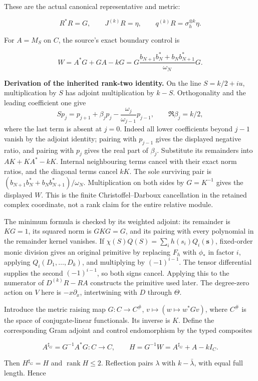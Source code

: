 These are the actual canonical representative and metric:

\[
R^*R=G,\qquad J^{(k)}R=\eta,\qquad
q^{(k)}R=\sigma_h^{\otimes k}\eta.
\]

For \(A=M_S\) on \(C\), the source's exact boundary control is

\[
\boxed{
W=A^*G+GA-kG
=G\frac{b_{N+1}b_N^*+b_Nb_{N+1}^*}{\omega_N}G.
}
\]

\textbf{Derivation of the inherited rank-two identity.}
On the line \(S=k/2+iu\), multiplication by \(S\) has adjoint
multiplication by \(k-S\). Orthogonality and the leading coefficient one give
\[
Sp_j=p_{j+1}+\beta_jp_j-\frac{\omega_j}{\omega_{j-1}}p_{j-1},
\qquad \Re\beta_j=k/2,
\]
where the last term is absent at \(j=0\).
Indeed all lower coefficients beyond \(j-1\) vanish by the adjoint identity;
pairing with \(p_{j-1}\) gives the displayed negative ratio, and pairing
with \(p_j\) gives the real part of \(\beta_j\). Substitute its remainders
into \(AK+KA^*-kK\). Internal neighbouring terms cancel with their exact
norm ratios, and the diagonal terms cancel \(kK\). The sole surviving pair
is \((b_{N+1}b_N^*+b_Nb_{N+1}^*)/\omega_N\).
Multiplication on both sides by \(G=K^{-1}\) gives the displayed \(W\).
This is the finite Christoffel--Darboux cancellation in the retained
complex coordinate, not a rank claim for the entire relative module.

The minimum formula is checked by its weighted adjoint:
its remainder is \(KG=1\), its squared norm is \(GKG=G\), and its
pairing with every polynomial in the remainder kernel vanishes.
If \(\chi(S)Q(S)=\sum_i h(s_i)Q_i(\mathbf s)\), fixed-order monic
division gives an original primitive by replacing \(F_h\) with \(\phi_*\)
in factor \(i\), applying \(Q_i(D_1,\ldots,D_k)\), and multiplying by
\((-1)^{i-1}\). The tensor differential supplies the second
\((-1)^{i-1}\), so both signs cancel. Applying this to the numerator
of \(D^{(k)}R-RA\) constructs the primitive used later.
The degree-zero action on \(V\) here is \(-x\partial_x\), intertwining
with \(D\) through \(\Theta\).

Introduce the metric raising map \(G:C\to C^\#\),
\(v\mapsto(w\mapsto w^*Gv)\), where \(C^\#\) is the space of
conjugate-linear functionals. Its inverse is \(K\). Define the
corresponding Gram adjoint and control endomorphism by the typed
composites

\[
A^{\sharp_G}=G^{-1}A^*G:C\to C,
\qquad
H=G^{-1}W=A^{\sharp_G}+A-kI_C.
\]

Then \(H^{\sharp_G}=H\) and \(\operatorname{rank}H\leq2\). Reflection
pairs \(\lambda\) with \(k-\bar\lambda\), with equal full length. Hence

